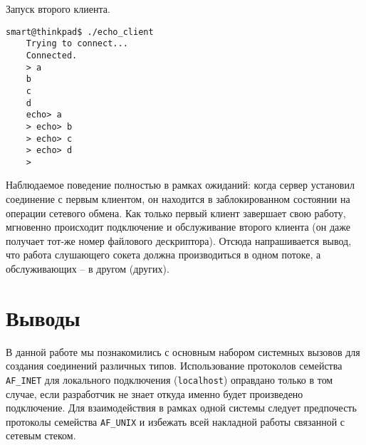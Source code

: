 Запуск второго клиента.
\begin{Verbatim}[frame=single]
    smart@thinkpad$ ./echo_client 
    Trying to connect...
    Connected.
    > a
    b
    c
    d
    echo> a
    > echo> b
    > echo> c
    > echo> d
    > 
\end{Verbatim}

Наблюдаемое поведение полностью в рамках ожиданий: когда сервер установил соединение с первым клиентом, он находится в заблокированном состоянии на операции сетевого обмена. Как только первый клиент завершает свою работу, мгновенно происходит подключение и обслуживание второго клиента (он даже получает тот-же номер файлового дескриптора). Отсюда напрашивается вывод, что работа слушающего сокета должна производиться в одном потоке, а обслуживающих -- в другом (других).

\section*{Выводы}

В данной работе мы познакомились с основным набором системных вызовов для создания соединений различных типов. Использование протоколов семейства \texttt{AF\_INET} для локального подключения (\texttt{localhost}) оправдано только в том случае, если разработчик не знает откуда именно будет произведено подключение. Для взаимодействия в рамках одной системы следует предпочесть протоколы семейства \texttt{AF\_UNIX} и избежать всей накладной работы связанной с сетевым стеком.
